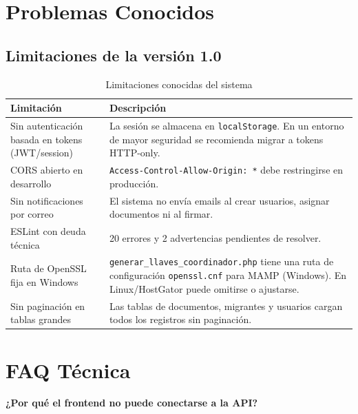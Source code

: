 \documentclass[10pt,letterpaper]{report}
\begin{document}
\chapter{Problemas Conocidos}

\section{Limitaciones de la versión 1.0}

\begin{table}[H]
\centering
\caption{Limitaciones conocidas del sistema}
\label{tab:limitaciones}
\begin{tabular}{p{} p{}}
\toprule
\textbf{Limitación} & \textbf{Descripción} \\
\midrule
Sin autenticación basada en tokens (JWT/session) & La sesión se almacena en \texttt{localStorage}. En un entorno de mayor seguridad se recomienda migrar a tokens HTTP-only. \\
CORS abierto en desarrollo & \texttt{Access-Control-Allow-Origin: *} debe restringirse en producción. \\
Sin notificaciones por correo & El sistema no envía emails al crear usuarios, asignar documentos ni al firmar. \\
ESLint con deuda técnica & 20 errores y 2 advertencias pendientes de resolver. \\
Ruta de OpenSSL fija en Windows & \texttt{generar\_llaves\_coordinador.php} tiene una ruta de configuración \texttt{openssl.cnf} para MAMP (Windows). En Linux/HostGator puede omitirse o ajustarse. \\
Sin paginación en tablas grandes & Las tablas de documentos, migrantes y usuarios cargan todos los registros sin paginación. \\
\bottomrule
\end{tabular}
\end{table}

\chapter{FAQ Técnica}

\textbf{¿Por qué el frontend no puede conectarse a la API?}
\end{document}
